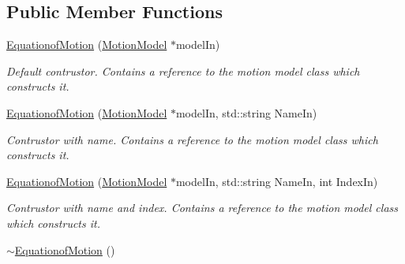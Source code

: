 \subsection*{Public Member Functions}
\begin{DoxyCompactItemize}
\item 
\hyperlink{classosea_1_1ofreq_1_1_equationof_motion_a61c6e25419cf9c5402a4e30496ef6b19}{Equationof\-Motion} (\hyperlink{classosea_1_1ofreq_1_1_motion_model}{Motion\-Model} $\ast$model\-In)
\begin{DoxyCompactList}\small\item\em Default contrustor. Contains a reference to the motion model class which constructs it. \end{DoxyCompactList}\item 
\hyperlink{classosea_1_1ofreq_1_1_equationof_motion_adb22faa7fbb72f4ee01931fe6b9571ee}{Equationof\-Motion} (\hyperlink{classosea_1_1ofreq_1_1_motion_model}{Motion\-Model} $\ast$model\-In, std\-::string Name\-In)
\begin{DoxyCompactList}\small\item\em Contrustor with name. Contains a reference to the motion model class which constructs it. \end{DoxyCompactList}\item 
\hyperlink{classosea_1_1ofreq_1_1_equationof_motion_a334a999be59f6cba06cbbb2cf3134ad9}{Equationof\-Motion} (\hyperlink{classosea_1_1ofreq_1_1_motion_model}{Motion\-Model} $\ast$model\-In, std\-::string Name\-In, int Index\-In)
\begin{DoxyCompactList}\small\item\em Contrustor with name and index. Contains a reference to the motion model class which constructs it. \end{DoxyCompactList}\item 
\hypertarget{classosea_1_1ofreq_1_1_equationof_motion_ab06097df1a54719d7a5682babbd9f233}{\hyperlink{classosea_1_1ofreq_1_1_equationof_motion_ab06097df1a54719d7a5682babbd9f233}{$\sim$\-Equationof\-Motion} ()}\label{classosea_1_1ofreq_1_1_equationof_motion_ab06097df1a54719d7a5682babbd9f233}


\end{DoxyCompactItemize}

